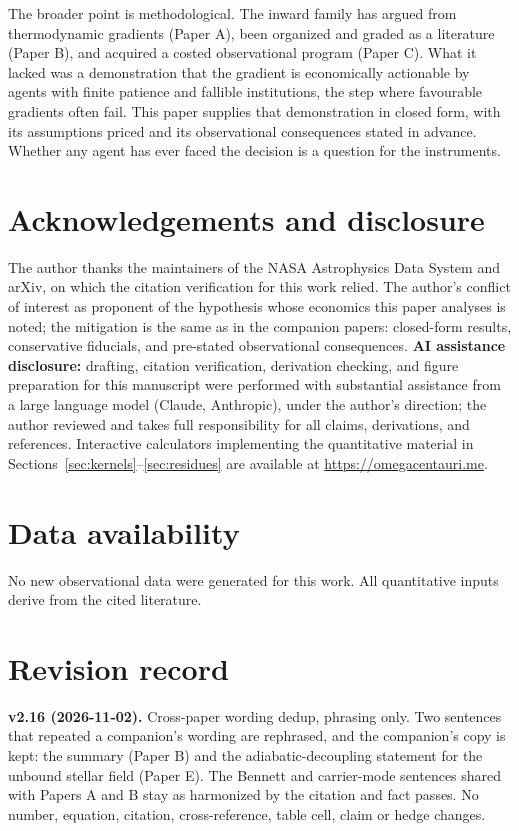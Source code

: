 \documentclass[11pt]{article}
\begin{document}
The broader point is methodological. The inward family has argued from thermodynamic gradients (Paper A), been organized and graded as a literature (Paper B), and acquired a costed observational program (Paper C). What it lacked was a demonstration that the gradient is economically actionable by agents with finite patience and fallible institutions, the step where favourable gradients often fail. This paper supplies that demonstration in closed form, with its assumptions priced and its observational consequences stated in advance. Whether any agent has ever faced the decision is a question for the instruments.

\section*{Acknowledgements and disclosure}

The author thanks the maintainers of the NASA Astrophysics Data System and arXiv, on which the citation verification for this work relied. The author's conflict of interest as proponent of the hypothesis whose economics this paper analyses is noted; the mitigation is the same as in the companion papers: closed-form results, conservative fiducials, and pre-stated observational consequences. \textbf{AI assistance disclosure:} drafting, citation verification, derivation checking, and figure preparation for this manuscript were performed with substantial assistance from a large language model (Claude, Anthropic), under the author's direction; the author reviewed and takes full responsibility for all claims, derivations, and references. Interactive calculators implementing the quantitative material in Sections~\ref{sec:kernels}--\ref{sec:residues} are available at \url{https://omegacentauri.me}.

\section*{Data availability}

No new observational data were generated for this work. All quantitative inputs derive from the cited literature.

\section*{Revision record}

\textbf{v2.16 (2026-11-02).} Cross-paper wording dedup, phrasing only. Two sentences that repeated a companion's wording are rephrased, and the companion's copy is kept: the \citet{Wright2023Landsberg} summary (Paper B) and the adiabatic-decoupling statement for the unbound stellar field (Paper E). The Bennett and carrier-mode sentences shared with Papers A and B stay as harmonized by the citation and fact passes. No number, equation, citation, cross-reference, table cell, claim or hedge changes.
\end{document}
